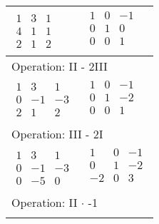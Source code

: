 \begin{longtable}{p{4cm}|p{3cm}}
    $\displaystyle\begin{matrix}
                          1 & 3 & 1 \\
                          4 & 1 & 1 \\
                          2 & 1 & 2
                      \end{matrix}$         &
    $\displaystyle\begin{matrix}
                          1 & 0 & -1 \\
                          0 & 1 & 0  \\
                          0 & 0 & 1  \\
                      \end{matrix}$                                                            \\\hline
    \multicolumn{2}{p{\dimexpr4cm+3cm+2\tabcolsep\relax}}{Operation: II - 2III}            \\\hline\pagebreak[0]

    $\displaystyle\begin{matrix}
                          1 & 3  & 1  \\
                          0 & -1 & -3 \\
                          2 & 1  & 2
                      \end{matrix}$         &
    $\displaystyle\begin{matrix}
                          1 & 0 & -1 \\
                          0 & 1 & -2 \\
                          0 & 0 & 1  \\
                      \end{matrix}$                                                            \\\hline
    \multicolumn{2}{p{\dimexpr4cm+3cm+2\tabcolsep\relax}}{Operation: III - 2I}             \\\hline\pagebreak[0]

    $\displaystyle\begin{matrix}
                          1 & 3  & 1  \\
                          0 & -1 & -3 \\
                          0 & -5 & 0
                      \end{matrix}$         &
    $\displaystyle\begin{matrix}
                          1  & 0 & -1 \\
                          0  & 1 & -2 \\
                          -2 & 0 & 3  \\
                      \end{matrix}$                                                            \\\hline
    \multicolumn{2}{p{\dimexpr4cm+3cm+2\tabcolsep\relax}}{Operation: II $\cdot$ -1}        \\\hline\pagebreak[0]


\end{longtable}
